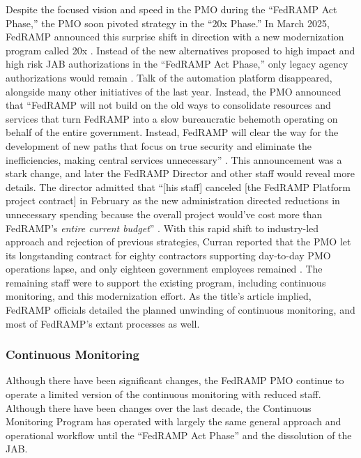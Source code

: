 \documentclass{jdf}
\begin{document}
Despite the focused vision and speed in the PMO during the ``FedRAMP Act Phase,'' the PMO soon pivoted strategy in the ``20x Phase.'' In March 2025, FedRAMP announced this surprise shift in direction with a new modernization program called 20x \citeyear{fedramp_blog_20x}. Instead of the new alternatives proposed to high impact and high risk JAB authorizations in the ``FedRAMP Act Phase,'' only legacy agency authorizations would remain \citeyear{fedramp_blog_20x}. Talk of the automation platform disappeared, alongside many other initiatives of the last year. Instead, the PMO announced that ``FedRAMP will not build on the old ways to consolidate resources and services that turn FedRAMP into a slow bureaucratic behemoth operating on behalf of the entire government. Instead, FedRAMP will clear the way for the development of new paths that focus on true security and eliminate the inefficiencies, making central services unnecessary'' \citeyear{fedramp_blog_20x}. This announcement was a stark change, and later the FedRAMP Director and other staff would reveal more details. The director admitted that ``[his staff] canceled [the FedRAMP Platform project contract] in February as the new administration directed reductions in unnecessary spending because the overall project would've cost more than FedRAMP's \textit{entire current budget}'' \citeyear{20x_waterman_platform_comment}. With this rapid shift to industry-led approach and rejection of previous strategies, Curran reported that the PMO let its longstanding contract for eighty contractors supporting day-to-day PMO operations lapse, and only eighteen government employees remained \citeyear{curran25}. The remaining staff were to support the existing program, including continuous monitoring, and this modernization effort. As the title's article implied, FedRAMP officials detailed the planned unwinding of continuous monitoring, and most of FedRAMP's extant processes as well.

\subsubsection{Continuous Monitoring} \label{conmon}

Although there have been significant changes, the FedRAMP PMO continue to operate a limited version of the continuous monitoring with reduced staff. Although there have been changes over the last decade, the Continuous Monitoring Program has operated with largely the same general approach and operational workflow until the ``FedRAMP Act Phase'' and the dissolution of the JAB.
\end{document}
